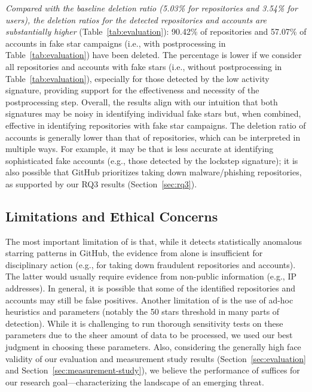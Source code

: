 \emph{Compared with the baseline deletion ratio (5.03\% for repositories and 3.54\% for users), the deletion ratios for the detected repositories and accounts are substantially higher} (Table~\ref{tab:evaluation}): 90.42\% of repositories and 57.07\% of accounts in fake star campaigns (i.e., with postprocessing in Table~\ref{tab:evaluation}) have been deleted. 
The percentage is lower if we consider all repositories and accounts with fake stars (i.e., without postprocessing in Table~\ref{tab:evaluation}), especially for those detected by the low activity signature, providing support for the effectiveness and necessity of the postprocessing step.
Overall, the results align with our intuition that both signatures may be noisy in identifying individual fake stars but, when combined, effective in identifying repositories with fake star campaigns. 
The deletion ratio of accounts is generally lower than that of repositories, which can be interpreted in multiple ways. For example, it may be that \SystemName is less accurate at identifying sophisticated fake accounts (e.g., those detected by the lockstep signature); it is also possible that GitHub prioritizes taking down malware/phishing repositories, as supported by our RQ3 results (Section~\ref{sec:rq3}).

\subsection{Limitations and Ethical Concerns}
\label{sec:limitations}

The most important limitation of \SystemName is that, while it detects statistically anomalous starring patterns in GitHub, the evidence from \SystemName alone is insufficient for disciplinary action (e.g., for taking down fraudulent repositories and accounts).
The latter would usually require evidence from non-public information (e.g., IP addresses).
In general, it is possible that some of the \SystemName identified repositories and accounts may still be false positives.
Another limitation of \SystemName is the use of ad-hoc heuristics and parameters (notably the 50 stars threshold in many parts of detection).
While it is challenging to run thorough sensitivity tests on these parameters due to the sheer amount of data to be processed, we used our best judgment in choosing these parameters.
Also, considering the generally high face validity of our evaluation and measurement study results (Section~\ref{sec:evaluation} and Section~\ref{sec:measurement-study}), we believe the performance of \SystemName suffices for our research goal---characterizing the landscape of an emerging threat.

